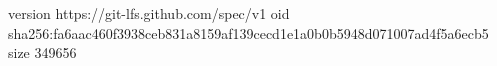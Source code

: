 version https://git-lfs.github.com/spec/v1
oid sha256:fa6aac460f3938ceb831a8159af139cecd1e1a0b0b5948d071007ad4f5a6ecb5
size 349656
